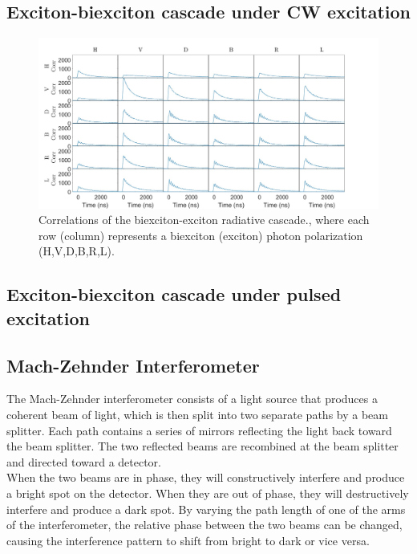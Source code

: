 \subsection{Exciton-biexciton cascade under CW excitation}
\begin{figure}[H]
	\centering
	\includegraphics[scale=0.24]{figures/XX_X_Correlations.jpg}
	\caption{ Correlations of the biexciton-exciton radiative cascade., where each row (column) represents a biexciton (exciton) photon polarization (H,V,D,B,R,L).}
	\label{fig:XX_X_Correlations}
\end{figure}
\subsection{Exciton-biexciton cascade under pulsed excitation}
\subsection{Mach-Zehnder Interferometer}
The Mach-Zehnder interferometer consists of a light source that produces a coherent beam of light, which is then split into two separate paths by a beam splitter. Each path contains a series of mirrors reflecting the light back toward the beam splitter. The two reflected beams are recombined at the beam splitter and directed toward a detector.\\
When the two beams are in phase, they will constructively interfere and produce a bright spot on the detector. When they are out of phase, they will destructively interfere and produce a dark spot. By varying the path length of one of the arms of the interferometer, the relative phase between the two beams can be changed, causing the interference pattern to shift from bright to dark or vice versa.

